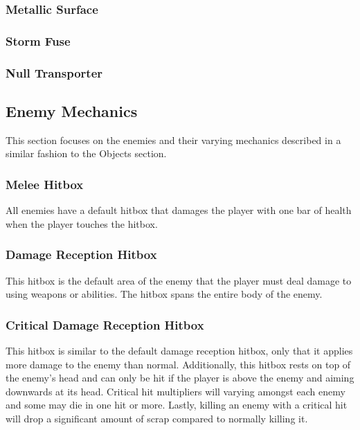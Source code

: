 \documentclass[12pt]{article}
\begin{document}
\subsubsection{Metallic Surface}

\subsubsection{Storm Fuse}

\subsubsection{Null Transporter}

\subsection{Enemy Mechanics}

This section focuses on the enemies and their varying mechanics described in a similar fashion to the Objects section. 

\subsubsection{Melee Hitbox}

All enemies have a default hitbox that damages the player with one bar of health when the player touches the hitbox. 

\subsubsection{Damage Reception Hitbox}

This hitbox is the default area of the enemy that the player must deal damage to using weapons or abilities. The hitbox spans the entire body of the enemy.

\subsubsection{Critical Damage Reception Hitbox}

This hitbox is similar to the default damage reception hitbox, only that it applies more damage to the enemy than normal. Additionally, this hitbox rests on top of the enemy's head and can only be hit if the player is above the enemy and aiming downwards at its head. Critical hit multipliers will varying amongst each enemy and some may die in one hit or more. Lastly, killing an enemy with a critical hit will drop a significant amount of scrap compared to normally killing it. 
\end{document}
